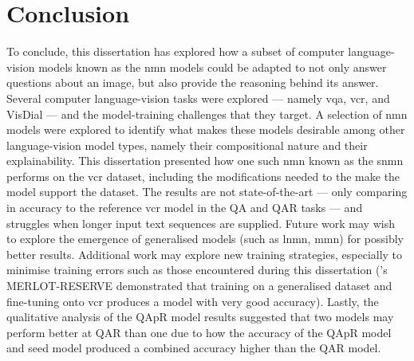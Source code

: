 \chapter{Conclusion}
\label{chp:conclusion}

To conclude, this dissertation has explored how a subset of computer language-vision models known as the \gls{nmn} models could be adapted to not only answer questions about an image, but also provide the reasoning behind its answer.
Several computer language-vision tasks were explored --- namely \gls{vqa}, \gls{vcr}, and VisDial --- and the model-training challenges that they target.
A selection of \gls{nmn} models were explored to identify what makes these models desirable among other language-vision model types, namely their compositional nature and their explainability.
This dissertation presented how one such \gls{nmn} known as the \gls{snmn} performs on the \gls{vcr} dataset, including the modifications needed to the make the model support the dataset.
The results are not state-of-the-art --- only comparing in accuracy to the reference \gls{vcr} model in the Q\rightarrow{}A and QA\rightarrow{}R tasks --- and struggles when longer input text sequences are supplied.
Future work may wish to explore the emergence of generalised models (such as \gls{lnmn}, \gls{mmn}) for possibly better results.
Additional work may explore new training strategies, especially to minimise training errors such as those encountered during this dissertation (\citeauthor{zellers_merlot_2022}'s MERLOT-RESERVE demonstrated that training on a generalised dataset and fine-tuning onto \gls{vcr} produces a model with very good accuracy).
Lastly, the qualitative analysis of the QAp\rightarrow{}R model results suggested that two models may perform better at Q\rightarrow{}AR than one due to how the accuracy of the QAp\rightarrow{}R model and seed model produced a combined accuracy higher than the Q\rightarrow{}AR model.
